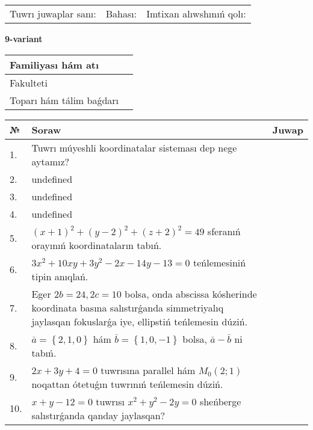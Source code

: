 \documentclass{article}
\begin{document}
\vspace{0.7cm}

\begin{tabular}{lll}
Tuwrı juwaplar sanı: \underline{\hspace{1cm}} & 
Bahası: \underline{\hspace{1cm}} & 
Imtixan alıwshınıń qolı: \underline{\hspace{2cm}} \\
\end{tabular}

\egroup

\newpage


\textbf{9-variant}\\

\bgroup
\def\arraystretch{1.6} %

\begin{tabular}{|m{5.7cm}|m{9.5cm}|}
\hline
Familiyası hám atı & \\
\hline
Fakulteti  & \\
\hline
Toparı hám tálim baǵdarı  & \\
\hline
\end{tabular}

\vspace{0.7cm}

\begin{tabular}{|m{0.7cm}|m{10cm}|m{4cm}|}
\hline
№ & Soraw & Juwap \\
\hline
1. & Tuwrı múyeshli koordinatalar sisteması dep nege aytamız? &  \\
\hline
2. & undefined &  \\
\hline
3. & undefined &  \\
\hline
4. & undefined &  \\
\hline
5. & \((x + 1) ^{2} + (y - 2) ^{2} + (z + 2) ^{2} = 49\) sferanıń orayınıń koordinataların tabıń. &  \\
\hline
6. & \(3 x^{2} + 10 xy + 3 y^{2} - 2 x - 14 y - 13 = 0\) teńlemesiniń tipin anıqlań. &  \\
\hline
7. & Eger \(2 b = 24, 2 c = 10\) bolsa, onda abscissa kósherinde koordinata basına salıstırǵanda simmetriyalıq jaylasqan fokuslarǵa iye, ellipstiń teńlemesin dúziń. &  \\
\hline
8. & \(\bar{a} = \left\{ 2, 1, 0 \right\}\) hám \(\bar{b} = \left\{ 1, 0,- 1 \right\}\) bolsa, \(\bar{a} - \bar{b}\) ni tabıń. &  \\
\hline
9. & \(2 x + 3 y + 4 = 0\) tuwrısına parallel hám \(M_{0} (2;1)\) noqattan ótetuǵın tuwrınıń teńlemesin dúziń. &  \\
\hline
10. & \(x + y - 12 = 0\) tuwrısı \(x^{2} + y^{2} - 2 y = 0\) sheńberge salıstırǵanda qanday jaylasqan? & \\
\hline
\end{tabular}
\end{document}
